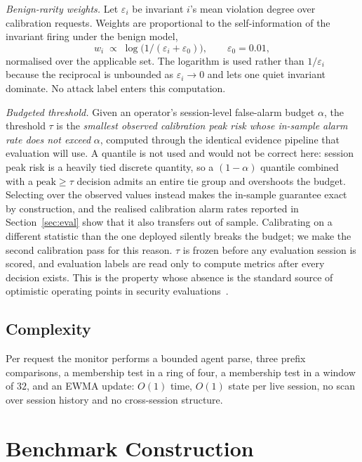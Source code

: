 \documentclass[conference]{IEEEtran}
\begin{document}
\emph{Benign-rarity weights.}  Let $\varepsilon_i$ be invariant $i$'s mean
violation degree over calibration requests.  Weights are proportional to the
self-information of the invariant firing under the benign model,
\begin{equation}
w_i \;\propto\; \log\!\big(1/(\varepsilon_i+\varepsilon_0)\big),
\qquad \varepsilon_0 = 0.01 ,
\end{equation}
normalised over the applicable set.  The logarithm is used rather than
$1/\varepsilon_i$ because the reciprocal is unbounded as $\varepsilon_i\to 0$
and lets one quiet invariant dominate.  No attack label enters this
computation.

\emph{Budgeted threshold.}  Given an operator's session-level false-alarm budget
$\alpha$, the threshold $\tau$ is the \emph{smallest observed calibration peak
risk whose in-sample alarm rate does not exceed} $\alpha$, computed through the
identical evidence pipeline that evaluation will use.  A quantile is not used and
would not be correct here: session peak risk is a heavily tied discrete quantity,
so a $(1-\alpha)$ quantile combined with a $\text{peak}\geq\tau$ decision admits
an entire tie group and overshoots the budget.  Selecting over the observed
values instead makes the in-sample guarantee exact by construction, and the
realised calibration alarm rates reported in Section~\ref{sec:eval} show that it
also transfers out of sample.  Calibrating on a different statistic than the one
deployed silently breaks the budget; we make the second calibration pass for
this reason.  $\tau$ is frozen before any evaluation session is scored, and
evaluation labels are read only to compute metrics after every decision exists.
This is the property whose absence is the standard source of optimistic
operating points in security evaluations~\cite{arp2022dosdonts}.

\subsection{Complexity}

Per request the monitor performs a bounded agent parse, three prefix
comparisons, a membership test in a ring of four, a membership test in a window
of $32$, and an EWMA update: $O(1)$ time, $O(1)$ state per live session, no
scan over session history and no cross-session structure.

\section{Benchmark Construction}
\label{sec:benchmark}
\end{document}
